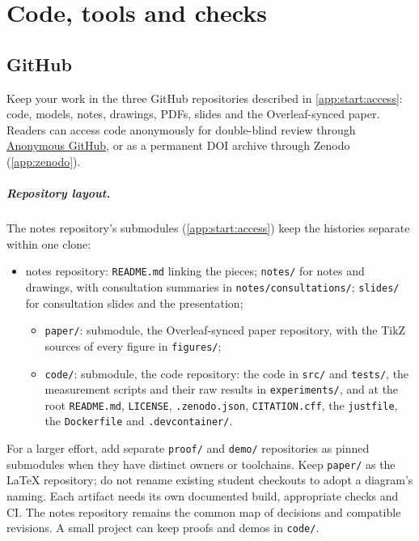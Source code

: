 \chapter{Code, tools and checks}\label{app:code}
\section{GitHub}\label{app:code:github}
Keep your work in the three GitHub repositories described in \cref{app:start:access}: code, models, notes, drawings, PDFs, slides and the Overleaf-synced paper. Readers can access code anonymously for double-blind review through \href{https://anonymous.4open.science/}{Anonymous GitHub}, or as a permanent DOI archive through Zenodo (\cref{app:zenodo}).

\paragraph{Repository layout.} The notes repository's submodules (\cref{app:start:access}) keep the histories separate within one clone:
\begin{itemize}[noitemsep]
  \item notes repository: \texttt{README.md} linking the pieces; \texttt{notes/} for notes and drawings, with consultation summaries in \texttt{notes/consultations/}; \texttt{slides/} for consultation slides and the presentation;
  \begin{itemize}[noitemsep]
    \item \texttt{paper/}: submodule, the Overleaf-synced paper repository, with the TikZ sources of every figure in \texttt{figures/};
    \item \texttt{code/}: submodule, the code repository: the code in \texttt{src/} and \texttt{tests/}, the measurement scripts and their raw results in \texttt{experiments/}, and at the root \texttt{README.md}, \texttt{LICENSE}, \texttt{.zenodo.json}, \texttt{CITATION.cff}, the \texttt{justfile}, the \texttt{Dockerfile} and \texttt{.devcontainer/}.
  \end{itemize}
\end{itemize}
For a larger effort, add separate \texttt{proof/} and \texttt{demo/} repositories as pinned submodules when they have distinct owners or toolchains. Keep \texttt{paper/} as the LaTeX repository; do not rename existing student checkouts to adopt a diagram's naming. Each artifact needs its own documented build, appropriate checks and CI. The notes repository remains the common map of decisions and compatible revisions. A small project can keep proofs and demos in \texttt{code/}.

